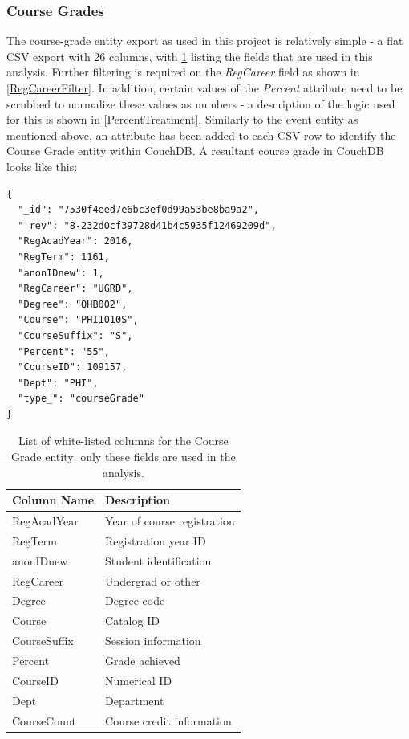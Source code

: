 \subsubsection*{Course Grades}
The course-grade entity export as used in this project is relatively simple - a flat CSV export with 26 columns, with \ref{Grades Columns} listing the fields that are used in this analysis. Further filtering is required on the \textit{RegCareer} field as shown in \ref{RegCareerFilter}. In addition, certain values of the \textit{Percent} attribute need to be scrubbed to normalize these values as numbers - a description of the logic used for this is shown in \ref{PercentTreatment}. Similarly to the event entity as mentioned above, an attribute has been added to each CSV row to identify the Course Grade entity within CouchDB. A resultant course grade in CouchDB looks like this:

\begin{verbatim}
{
  "_id": "7530f4eed7e6bc3ef0d99a53be8ba9a2",
  "_rev": "8-232d0cf39728d41b4c5935f12469209d",
  "RegAcadYear": 2016,
  "RegTerm": 1161,
  "anonIDnew": 1,
  "RegCareer": "UGRD",
  "Degree": "QHB002",
  "Course": "PHI1010S",
  "CourseSuffix": "S",
  "Percent": "55",
  "CourseID": 109157,
  "Dept": "PHI",
  "type_": "courseGrade"
}
\end{verbatim}


\begin{table}[]
    \centering
    \caption{List of white-listed columns for the Course Grade entity: only these fields are used in the analysis.}
    \label{Grades Columns}
    \begin{tabular}{ll}
        Column Name  & Description                 \\ \hline
        RegAcadYear  & Year of course registration \\
        RegTerm      & Registration year ID        \\
        anonIDnew    & Student identification      \\
        RegCareer    & Undergrad or other          \\
        Degree       & Degree code                 \\
        Course       & Catalog ID                  \\
        CourseSuffix & Session information         \\
        Percent      & Grade achieved              \\
        CourseID     & Numerical ID                \\
        Dept         & Department                  \\
        CourseCount  & Course credit information   \\ \hline
    \end{tabular}
\end{table}

